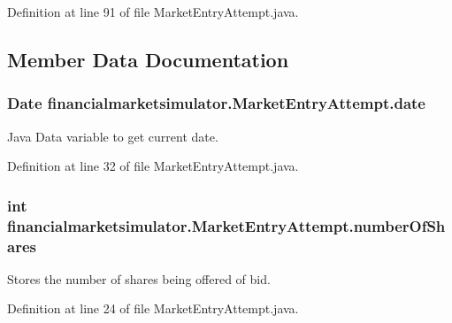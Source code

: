 Definition at line 91 of file Market\+Entry\+Attempt.\+java.



\subsection{Member Data Documentation}
\hypertarget{classfinancialmarketsimulator_1_1_market_entry_attempt_a7dcd3bab8cbe1498e452bec851e5ec5d}{
\subsubsection[{date}]{\setlength{\rightskip}{0pt plus 5cm}Date financialmarketsimulator.\+Market\+Entry\+Attempt.\+date\hspace{0.3cm}{\ttfamily [protected]}}}\label{classfinancialmarketsimulator_1_1_market_entry_attempt_a7dcd3bab8cbe1498e452bec851e5ec5d}
Java Data variable to get current date. 

Definition at line 32 of file Market\+Entry\+Attempt.\+java.

\hypertarget{classfinancialmarketsimulator_1_1_market_entry_attempt_a5333f3fb0b26cba3382a05e582f86d8a}{
\subsubsection[{number\+Of\+Shares}]{\setlength{\rightskip}{0pt plus 5cm}int financialmarketsimulator.\+Market\+Entry\+Attempt.\+number\+Of\+Shares\hspace{0.3cm}{\ttfamily [protected]}}}\label{classfinancialmarketsimulator_1_1_market_entry_attempt_a5333f3fb0b26cba3382a05e582f86d8a}
Stores the number of shares being offered of bid. 

Definition at line 24 of file Market\+Entry\+Attempt.\+java.

